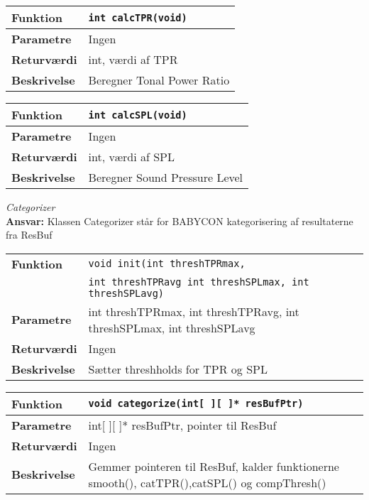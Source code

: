 \begin{center}
    \begin{tabular}{ | l | p{} |}
    \hline
    \textbf{Funktion}	& \verb+int calcTPR(void) +						\\ \hline
    \textbf{Parametre} 	& Ingen		\\ \hline
    \textbf{Returværdi}	& int, værdi af TPR 								\\ \hline
    \textbf{Beskrivelse}& Beregner Tonal Power Ratio		\\ \hline
    \end{tabular}
\end{center} 

\begin{center}
    \begin{tabular}{ | l | p{} |}
    \hline
    \textbf{Funktion}	& \verb+int calcSPL(void) +						\\ \hline
    \textbf{Parametre} 	& Ingen		\\ \hline
    \textbf{Returværdi}	& int, værdi af SPL 								\\ \hline
    \textbf{Beskrivelse}& Beregner Sound Pressure Level		\\ \hline
    \end{tabular}
\end{center} 


\textit{Categorizer} \\
\textbf{Ansvar:} Klassen Categorizer står for BABYCON kategorisering af resultaterne fra ResBuf

\begin{center}
    \begin{tabular}{ | l | p{} |}
    \hline
    \textbf{Funktion}	& \verb+void init(int threshTPRmax,+ \\ &
    						 \verb+int threshTPRavg int threshSPLmax, int threshSPLavg) +						\\ \hline
    \textbf{Parametre} 	& int threshTPRmax, int threshTPRavg, int threshSPLmax, int threshSPLavg		\\ \hline
    \textbf{Returværdi}	& Ingen	 								\\ \hline
    \textbf{Beskrivelse}& Sætter threshholds for TPR og SPL		\\ \hline
    \end{tabular}
\end{center}

\begin{center}
    \begin{tabular}{ | l | p{} |}
    \hline
    \textbf{Funktion}	& \verb+void categorize(int[ ][ ]* resBufPtr) +						\\ \hline
    \textbf{Parametre} 	& int[ ][ ]* resBufPtr, pointer til ResBuf		\\ \hline
    \textbf{Returværdi}	& Ingen	 								\\ \hline
    \textbf{Beskrivelse}& Gemmer pointeren til ResBuf, kalder funktionerne smooth(), catTPR(),catSPL() og compThresh()		\\ \hline
    \end{tabular}
\end{center}

